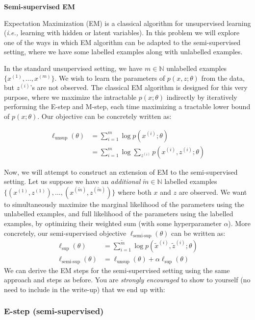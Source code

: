 \clearpage
\item {} {\bf Semi-supervised EM}

Expectation Maximization (EM) is a classical algorithm for unsupervised learning (\emph{i.e.,} learning with hidden or latent variables). In this problem we will explore one of the ways in which EM algorithm can be adapted to the semi-supervised setting, where we have some labelled examples along with unlabelled examples.

In the standard unsupervised setting, we have $m \in \mathbb{N}$ unlabelled examples $\{x^{(1)},\ldots,x^{(m)}\}$. We wish to learn the parameters of $p(x,z;\theta)$ from the data, but $z^{(i)}$'s are not observed. The classical EM algorithm is designed for this very purpose, where we maximize the intractable $p(x;\theta)$ indirectly by iteratively performing the E-step and M-step, each time maximizing a tractable lower bound of $p(x;\theta)$. Our objective can be concretely written as:

\begin{align*}
    \ell_{\text{unsup}}(\theta) &= \sum_{i=1}^m \log p(x^{(i)};\theta) \\
    &= \sum_{i=1}^m \log \sum_{z^{(i)}} p(x^{(i)},z^{(i)};\theta)
\end{align*}


Now, we will attempt to construct an extension of EM to the semi-supervised setting. Let us suppose we have an \emph{additional} $\tilde{m} \in \mathbb{N}$ labelled examples $\{(x^{(1)},z^{(1)}),\ldots,(x^{(\tilde{m})},z^{(\tilde{m})})\}$ where both $x$ and $z$ are observed. We want to simultaneously maximize the marginal likelihood of the parameters using the unlabelled examples, and full likelihood of the parameters using the labelled examples, by optimizing their weighted sum (with some hyperparameter $\alpha$). More concretely, our semi-supervised objective $\ell_\text{semi-sup}(\theta)$ can be written as:
%
\begin{align*}
    \ell_\text{sup}(\theta) &= \sum_{i=1}^{\tilde{m}} \log p(\tilde{x}^{(i)},\tilde{z}^{(i)};\theta) \\
    \ell_{\text{semi-sup}}(\theta) &= \ell_\text{unsup}(\theta) + \alpha \ell_\text{sup}(\theta)
\end{align*}
%
We can derive the EM steps for the semi-supervised setting using the same approach and steps as before. You are \emph{strongly encouraged} to show to yourself (no need to include in the write-up) that we end up with:

\subsubsection*{E-step (semi-supervised)}

